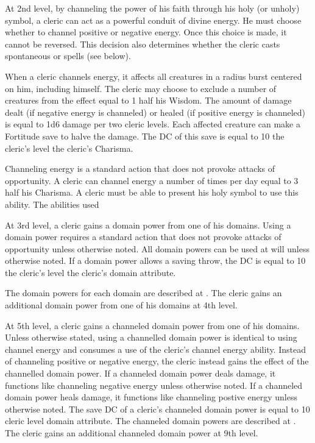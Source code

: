  At 2nd level, by channeling the power of his faith through his holy (or unholy) symbol, a cleric can act as a powerful conduit of divine energy. He must choose whether to channel positive or negative energy. Once this choice is made, it cannot be reversed. This decision also determines whether the cleric casts spontaneous  or  spells (see below).

When a cleric channels energy, it affects all creatures in a \areamed radius burst centered on him, including himself. The cleric may choose to exclude a number of creatures from the effect equal to 1 \add half his Wisdom. The amount of damage dealt (if negative energy is channeled) or healed (if positive energy is channeled) is equal to 1d6 damage per two cleric levels. Each affected creature can make a Fortitude save to halve the damage. The DC of this save is equal to 10 \add the cleric's level \add the cleric's Charisma.

Channeling energy is a standard action that does not provoke attacks of opportunity. A cleric can channel energy a number of times per day equal to 3 \add half his Charisma. A cleric must be able to present his holy symbol to use this ability. The abilities used 

 At 3rd level, a cleric gains a domain power from one of his domains. Using a domain power requires a standard action that does not provoke attacks of opportunity unless otherwise noted. All domain powers can be used at will unless otherwise noted. If a domain power allows a saving throw, the DC is equal to 10 \add the cleric's level \add the cleric's domain attribute.

The domain powers for each domain are described at . The cleric gains an additional domain power from one of his domains at 4th level.

 At 5th level, a cleric gains a channeled domain power from one of his domains. Unless otherwise stated, using a channelled domain power is identical to using channel energy and consumes a use of the cleric's channel energy ability. Instead of channeling positive or negative energy, the cleric instead gains the effect of the channelled domain power. If a channeled domain power deals damage, it functions like channeling negative energy unless otherwise noted. If a channeled domain power heals damage, it functions like channeling postive energy unless otherwise noted. The save DC of a cleric's channeled domain power is equal to 10 \add cleric level \add domain attribute. The channeled domain powers are described at . The cleric gains an additional channeled domain power at 9th level.

